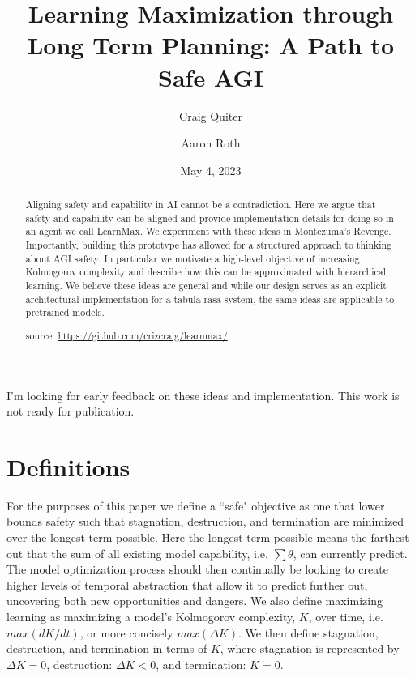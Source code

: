 \documentclass{article}
\title{Learning Maximization through Long Term Planning: A Path to Safe AGI}
\author{Craig Quiter}
\author{Aaron Roth}
\date{May 4, 2023}
\begin{document}
\maketitle

\begin{tcolorbox}
I'm looking for early feedback on these ideas and implementation. This work is not ready for publication.
\end{tcolorbox}

\begin{abstract}
Aligning safety and capability in AI cannot be a contradiction.
Here we argue that safety and capability can be aligned and provide implementation details for doing so in an agent we call LearnMax. We experiment with these ideas in Montezuma's Revenge. Importantly, building this prototype has allowed for a structured approach to thinking about AGI safety. In particular we motivate a high-level objective of increasing Kolmogorov complexity and describe how this can be approximated with hierarchical learning. We believe these ideas are general and while our design serves as an explicit architectural implementation for a tabula rasa system, the same ideas are applicable to pretrained models.

source: \href{https://github.com/crizcraig/learnmax/}{https://github.com/crizcraig/learnmax/}
\end{abstract}

\setcounter{secnumdepth}{-1}

\section{Definitions}

For the purposes of this paper we define a \textquotedblleft safe" objective as one that lower bounds safety such that stagnation, destruction, and termination are minimized over the longest term possible. Here the longest term possible means the farthest out that the sum of all existing model capability, i.e. $\sum{}\theta$, can currently predict. The model optimization process should then continually \cite{stanley2005evolving} be looking to create higher levels of temporal abstraction that allow it to predict further out, uncovering both new opportunities and dangers. We also define maximizing learning as maximizing a model's Kolmogorov complexity\cite{li2008introduction}, $K$, over time, i.e. $max(dK/dt)$, or more concisely $max(\Delta K)$. We then define stagnation, destruction, and termination in terms of $K$, where stagnation is represented by $\Delta K = 0$, destruction: $\Delta K < 0$, and termination: $K = 0$.
\end{document}
